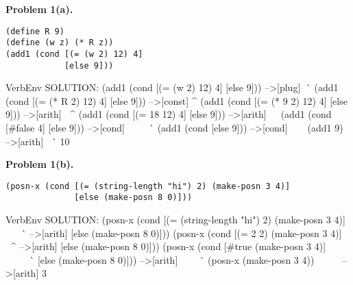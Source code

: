 \documentclass[12pt]{article}
\begin{document}
\noindent
{\bf Problem 1(a).}

\begin{verbatim}
(define R 9)
(define (w z) (* R z))
(add1 (cond [(= (w 2) 12) 4]
            [else 9]))
\end{verbatim}

\vskip 2.5in


\begin{SaveVerbatim}{VerbEnv}  
SOLUTION:
(add1 (cond [(= (w 2) 12) 4] [else 9]))   -->[plug]
                ^^^^^                                    
(add1 (cond [(= (* R 2) 12) 4] [else 9])) -->[const]
                   ^                          
(add1 (cond [(= (* 9 2) 12) 4] [else 9])) -->[arith]
                ^^^^^^^           
(add1 (cond [(= 18 12) 4] [else 9]))      -->[arith]
             ^^^^^^^^^            
(add1 (cond [#false 4] [else 9]))         -->[cond]
      ^^^^^^^^^^^^^^^^^^^^^^^^^^            
(add1 (cond [else 9]))                    -->[cond]
      ^^^^^^^^^^^^^^^             
(add1 9)                                  -->[arith]
^^^^^^^^                          
10
\end{SaveVerbatim}

\censor{\vspace{-2.5in}}




\noindent
{\bf Problem 1(b).}

\begin{verbatim}
(posn-x (cond [(= (string-length "hi") 2) (make-posn 3 4)]
              [else (make-posn 8 0)]))
\end{verbatim}


\begin{SaveVerbatim}{VerbEnv}
SOLUTION:
(posn-x (cond [(= (string-length "hi") 2) (make-posn 3 4)]
                  ^^^^^^^^^^^^^^^^^^^^                     -->[arith]
              [else (make-posn 8 0)]))
(posn-x (cond [(= 2 2) (make-posn 3 4)]
               ^^^^^^^                                     -->[arith]
              [else (make-posn 8 0)]))
(posn-x (cond [#true (make-posn 3 4)]
        ^^^^^^^^^^^^^^^^^^^^^^^^^^^^^       
              [else (make-posn 8 0)]))                     -->[arith]
              ^^^^^^^^^^^^^^^^^^^^^^^         
(posn-x (make-posn 3 4))              
^^^^^^^^^^^^^^^^^^^^^^^^                                   -->[arith]
3
\end{SaveVerbatim}

\end{document}
